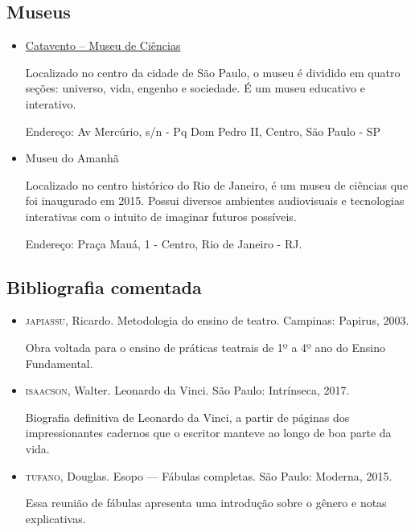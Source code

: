 \documentclass[11pt]{extarticle}
\begin{document}
\subsection{Museus}

\begin{itemize}

\item \href{https://museucatavento.org.br/}{Catavento – Museu de Ciências}

Localizado no centro da cidade de São Paulo, o museu é dividido em quatro seções: universo, vida, engenho e sociedade. É um museu educativo e interativo.

Endereço: Av Mercúrio, s/n - Pq Dom Pedro II, Centro, São Paulo - SP

\item {Museu do Amanhã}

Localizado no centro histórico do Rio de Janeiro, é um museu de ciências que foi inaugurado em 2015. Possui diversos ambientes audiovisuais e tecnologias interativas com o intuito de imaginar futuros possíveis.

Endereço: Praça Mauá, 1 - Centro, Rio de Janeiro - RJ.

\end{itemize}

\subsection{Bibliografia comentada}

\begin{itemize}

\item \textsc{japiassu}, Ricardo. Metodologia do ensino de teatro. Campinas: Papirus, 2003.

Obra voltada para o ensino de práticas teatrais de 1º a 4º ano do Ensino Fundamental.

\item \textsc{isaacson}, Walter. Leonardo da Vinci. São Paulo: Intrínseca, 2017.

Biografia definitiva de Leonardo da Vinci, a partir de páginas dos impressionantes cadernos que o escritor manteve ao longo de boa parte da vida.

\item \textsc{tufano}, Douglas. Esopo --- Fábulas completas. São Paulo: Moderna, 2015.
 
Essa reunião de fábulas apresenta uma introdução sobre o gênero e notas explicativas.

\end{itemize}
\end{document}
